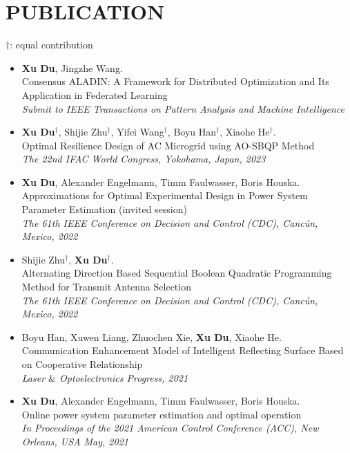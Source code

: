 \documentclass[paper=a4,fontsize=11pt]{scrartcl} %
\newcommand{\NewPart}[1]{\section*{\uppercase{#1}}}
\newcommand{\EducationEntry}[4]{
	\noindent \textbf{#1} \hfill      %
	\colorbox{White}{%
		\parbox{5cm}{%
			\hfill\color{Black}#2}} \par  %
	\noindent \textit{#3} \par        %
	\noindent\hangindent=2em\hangafter=0 \small #4 %
	\normalsize \par}
\begin{document}
		
		\NewPart{PUBLICATION}{}
		$\dag$:  equal contribution
		\begin{itemize}
			\item  { \textbf{Xu Du}, Jingzhe Wang. \\
				{Consensus ALADIN: A Framework for
					Distributed Optimization and Its Application in
					Federated Learning}\\
				\emph{ Submit to IEEE Transactions on Pattern Analysis and Machine Intelligence
			} }
			
			
			\item  { \textbf{Xu Du}$^{\dag}$, Shijie Zhu$^{\dag}$, Yifei Wang$^{\dag}$, Boyu Han$^{\dag}$, Xiaohe He$^{\dag}$. \\
				{Optimal Resilience Design of AC Microgrid
					using AO-SBQP Method}\\
				\emph{ The 22nd IFAC World Congress, Yokohama, Japan, 2023
			} }
			
			\item  { \textbf{Xu Du}, Alexander Engelmann, Timm Faulwasser, Boris Houska. \\
				{Approximations for Optimal Experimental Design
					in Power System Parameter Estimation (invited session)}\\
				\emph{ The 61th IEEE Conference on Decision and Control (CDC), Canc\'un, Mexico, 2022
			} }
			
			
			\item  { Shijie Zhu$^{\dag}$, \textbf{Xu Du}$^{\dag}$. \\
				{Alternating Direction Based Sequential Boolean Quadratic Programming Method for Transmit Antenna Selection}\\
				\emph{ The 61th IEEE Conference on Decision and Control (CDC), Canc\'un, Mexico, 2022
			} }
			
			\item  { Boyu Han, Xuwen Liang, Zhuochen Xie, \textbf{Xu Du}, Xiaohe He. \\
				{Communication Enhancement Model of Intelligent Reflecting Surface Based on Cooperative Relationship}\\
				\emph{Laser $\&$ Optoelectronics Progress, 2021
			} }
			
			\item  { \textbf{Xu Du}, Alexander Engelmann, Timm Faulwasser, Boris Houska. \\
				{Online power system parameter estimation and optimal operation}\\
				\emph{In Proceedings of the 2021 American Control Conference (ACC), New Orleans, USA May, 2021
			} }
			

\end{itemize}
\end{document}
